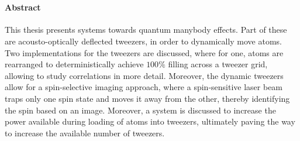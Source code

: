 \cleardoublepage
\thispagestyle{plain}

\makeatletter
\begin{center}
	\large\textbf{\@title}\\
	\normalsize\@author
\end{center}
\makeatother

\paragraph{Abstract}

This thesis presents systems towards quantum manybody effects. Part of these are acousto-optically deflected tweezers, in order to dynamically move atoms. Two implementations for the tweezers are discussed, where for one, atoms are rearranged to deterministically achieve $100\%$ filling across a tweezer grid, allowing to study correlations in more detail. Moreover, the dynamic tweezers allow for a spin-selective imaging approach, where a spin-sensitive laser beam traps only one spin state and moves it away from the other, thereby identifying the spin based on an image. Moreover, a system is discussed to increase the power available during loading of atoms into tweezers, ultimately paving the way to increase the available number of tweezers.

